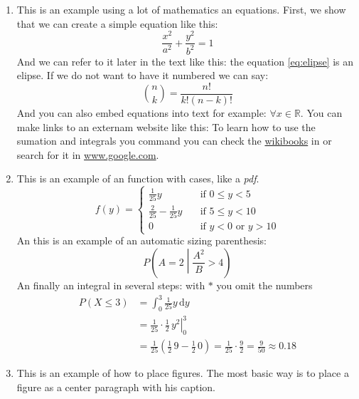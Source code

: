 \begin{enumerate}
 \item 
 This is an example using a lot of mathematics an equations. 
 First, we show that we can create a simple equation like this:
 \begin{equation}
 \label{eq:elipse}
 \frac{x^{2}}{a^{2}} + \frac{y^{2}}{b^{2}} = 1
 \end{equation}
 And we can refer to it later in the text like this: the equation \eqref{eq:elipse} is an elipse. If we do not want to have it numbered we can say:
 \begin{equation}
 \nonumber
 \binom{n}{k} = \frac{n!}{k!(n-k)!} 
 \end{equation}
 And you can also embed equations into text for example: $\forall x \in \mathbb{R}$. 
 You can make links to an externam website like this: 
 To learn how to use the sumation and integrals you command you can check the \href{https://en.wikibooks.org/wiki/LaTeX/Mathematics#Sums_and_integrals}{wikibooks} 
 in or search for it in \url{www.google.com}.
 
 \item This is an example of an function with cases, like a \emph{pdf}.
 \begin{equation}
  \label{eq:pdf}
  f(y) =
  \begin{cases}
    \frac{1}{25} y & \quad \text{if } 0 \leq y < 5 \\
    \frac{2}{25} - \frac{1}{25} y & \quad \text{if } 5 \leq y < 10 \\
    0 & \quad \text{if } y < 0 \text{ or } y > 10
  \end{cases}
 \end{equation}
 An this is an example of an automatic sizing parenthesis:
 \begin{equation}
  \nonumber
  P\left(A=2\middle|\frac{A^2}{B}>4\right)
 \end{equation}
 An finally an integral in several steps: with $*$ you omit the numbers
\begin{align*}
P\left(X \leq 3 \right) &= \int_{0}^{3} \frac{1}{25} y \,\mathrm{d}y \\
     &= \left. \frac{1}{25} \cdot \frac{1}{2} \, y^{2} \right|_0^3 \\
     &= \frac{1}{25} \left( \frac{1}{2} \, 9 - \frac{1}{2} \, 0 \right) =
     \frac{1}{25} \cdot \frac{9}{2} = \frac{9}{50} \approx 0.18 
\end{align*}

 \item This is an example of how to place figures. The most basic way is to place a figure as a center paragraph with his caption.
 

\end{enumerate}
